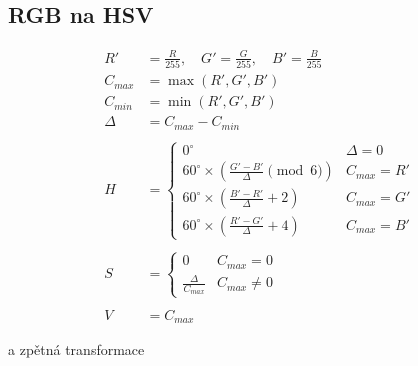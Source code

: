 \documentclass[FM,DP]{tulthesis}
\begin{document}
\subsection{RGB na HSV}

\[
    \begin{aligned}
        R'      & = \frac{R}{255}, \quad G' = \frac{G}{255}, \quad B' = \frac{B}{255}              \\
        C_{max} & = \max(R', G', B')                                                               \\
        C_{min} & = \min(R', G', B')                                                               \\
        \Delta  & = C_{max} - C_{min}                                                              \\
        \\
        H       & = \begin{cases}
                        0^\circ                                                     & \Delta = 0   \\
                        60^\circ \times \left(\frac{G' - B'}{\Delta} \pmod 6\right) & C_{max} = R' \\
                        60^\circ \times \left(\frac{B' - R'}{\Delta} + 2\right)     & C_{max} = G' \\
                        60^\circ \times \left(\frac{R' - G'}{\Delta} + 4\right)     & C_{max} = B'
                    \end{cases} \\
        \\
        S       & = \begin{cases}
                        0                      & C_{max} = 0    \\
                        \frac{\Delta}{C_{max}} & C_{max} \neq 0
                    \end{cases}                                    \\
        \\
        V       & = C_{max}
    \end{aligned}
\]

a zpětná transformace
\end{document}
